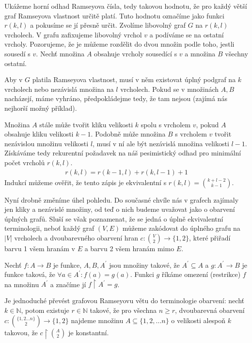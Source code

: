 \begin{t_proof}
  Ukážeme horní odhad Ramseyova čísla, tedy takovou hodnotu, že pro každý větší graf Ramseyova vlastnost určitě platí. Tuto hodnotu označíme jako funkci $r(k,l)$ a pokusíme se jí přesně určit. Zvolíme libovolný graf $G$ na $r(k,l)$ vrcholech. V grafu zafixujeme libovolný vrchol $v$ a podíváme se na ostatní vrcholy. Pozorujeme, že je můžeme rozdělit do dvou množin podle toho, jestli sousedí s $v$. Nechť množina $A$ obsahuje vrcholy sousedící s $v$ a množina $B$ všechny ostatní.
  
  Aby v $G$ platila Ramseyova vlastnost, musí v něm existovat úplný podgraf na $k$ vrcholech nebo nezávislá množina na $l$ vrcholech. Pokud se v množinách $A,B$ nacházejí, máme vyhráno, předpokládejme tedy, že tam nejsou (zajímá nás nejhorší možný příklad). 
  
  Množina $A$ stále může tvořit kliku velikosti $k$ spolu s vrcholem $v$, pokud $A$ obsahuje kliku velikosti $k-1$. Podobně může množina $B$ s vrcholem $v$ tvořit nezávislou množinu velikosti $l$, musí v ní ale být nezávislá množina velikosti $l-1$. Získáváme tedy rekurentní požadavek na náš pesimistický odhad pro minimální počet vrcholů $r(k,l)$.
  \begin{align*}
    r(k,l)=r(k-1,l)+r(k,l-1)+1
  \end{align*}
  Indukcí můžeme ověřit, že tento zápis je ekvivalentní s $r(k,l)=\binom{k+l-2}{k-1}$.
\end{t_proof}

Nyní drobně změníme úhel pohledu. Do současné chvíle nás v grafech zajímaly jen kliky a nezávislé množiny, od teď o nich budeme uvažovat jako o obarvení úplných grafů. Sluší se však poznamenat, že se jedná o úplně ekvivalentní terminologii, neboť každý graf $(V,E)$ můžeme zakódovat do úplného grafu na $|V|$ vrcholech a dvoubarevného obarvení hran $c:\binom{V}{2}\rightarrow\{1,2\}$, které přiřadí barvu 1 všem hranám v $E$ a barvu 2 všem hranám mimo $E$.  

\begin{t_definition}
  Nechť $f:A\rightarrow B$ je funkce, $A,B,A^\prime$ jsou množiny takové, že $A^\prime\subseteq A$ a $g: A^\prime\rightarrow B$ je funkce taková, že $\forall a\in A^\prime:f(a)=g(a)$. Funkci $g$ říkáme omezení (restrikce) $f$ na množinu $A^\prime$ a značíme jí $f\restriction A^\prime=g$.
\end{t_definition}

\begin{t_remark}
  Je jednoduché převést grafovou Ramseyovu větu do terminologie obarvení: nechť $k\in\mathbb{N}$, potom existuje $r\in\mathbb{N}$ takové, že pro všechna $n\geq r$, dvoubarevná obarvení $c:\binom{\{1,2\dots n\}}{2}\rightarrow\{1,2\}$ najdeme množinu $A\subseteq\{1,2,\dots n\}$ o velikosti alespoň $k$ takovou, že $c\restriction\binom{A}{2}$ je konstantní.
\end{t_remark}

